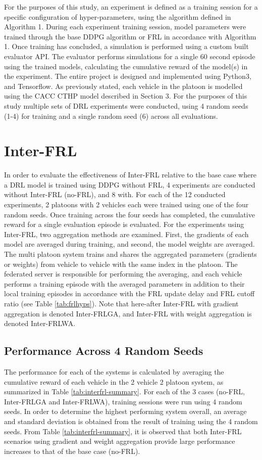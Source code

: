 For the purposes of this study, an experiment is defined as a training session for a specific configuration of hyper-parameters, using the algorithm defined in Algorithm 1. During each experiment training session, model parameters were trained through the base DDPG algorithm or FRL in accordance with Algorithm 1. Once training has concluded, a simulation is performed using a custom built evaluator API.  The evaluator performs simulations for a single 60 second episode using the trained models, calculating the cumulative reward of the model(s) in the experiment.  The entire project is designed and implemented using Python3, and Tensorflow.  As previously stated, each vehicle in the platoon is modelled using the CACC CTHP model described in Section 3.  For the purposes of this study multiple sets of DRL experiments were conducted, using 4 random seeds (1-4) for training and a single random seed (6) across all evaluations.

\section{Inter-FRL}
In order to evaluate the effectiveness of Inter-FRL relative to the base case where a DRL model is trained using DDPG without FRL, 4 experiments are conducted without Inter-FRL (no-FRL), and 8 with.  For each of the 12 conducted experiments, 2 platoons with 2 vehicles each were trained using one of the four random seeds.  Once training across the four seeds has completed, the cumulative reward for a single evaluation episode is evaluated.  For the experiments using Inter-FRL, two aggregation methods are examined.  First, the gradients of each model are averaged during training, and second, the model weights are averaged.  The multi platoon system trains and shares the aggregated parameters (gradients or weights) from vehicle to vehicle with the same index in the platoon. The federated server is responsible for performing the averaging, and each vehicle performs a training episode with the averaged parameters in addition to their local training episodes in accordance with the FRL update delay and FRL cutoff ratio (see Table \ref{tab:frlhyps}). Note that here-after Inter-FRL with gradient aggregation is denoted Inter-FRLGA, and Inter-FRL with weight aggregation is denoted Inter-FRLWA.


\subsection{Performance Across 4 Random Seeds}
The performance for each of the systems is calculated by averaging the cumulative reward of each vehicle in the 2 vehicle 2 platoon system, as summarized in Table \ref{tab:interfrl-summary}.  For each of the 3 cases (no-FRL, Inter-FRLGA and Inter-FRLWA), training sessions were run using 4 random seeds.  In order to determine the highest performing system overall, an average and standard deviation is obtained from the result of training using the 4 random seeds. From Table \ref{tab:interfrl-summary}, it is observed that both Inter-FRL scenarios using gradient and weight aggregation provide large performance increases to that of the base case (no-FRL).  

